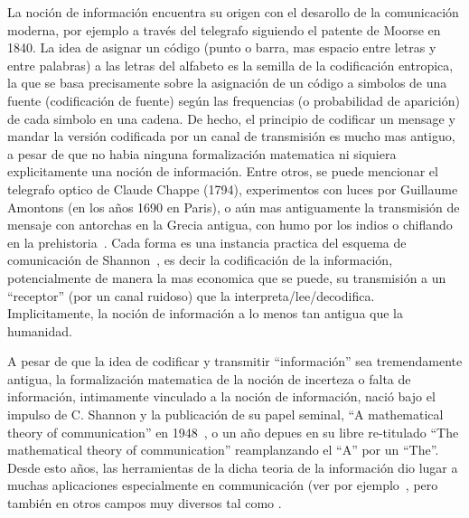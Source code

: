
\label{s:SZ:Introduccion}

La  noci\'on  de  informaci\'on encuentra  su  origen  con  el desarollo  de  la
comunicaci\'on  moderna,  por ejemplo  a  trav\'es  del  telegrafo siguiendo  el
patente de Moorse  en 1840. La idea  de asignar un c\'odigo (punto  o barra, mas
espacio entre letras  y entre palabras) a las letras del  alfabeto es la semilla
de  la  codificaci\'on   entropica,  la  que  se  basa   precisamente  sobre  la
asignaci\'on de un c\'odigo a  simbolos de una fuente (codificaci\'on de fuente)
seg\'un las frequencias  (o probabilidad de aparici\'on) de  cada simbolo en una
cadena.  De  hecho, el principio de  codificar un mensage y  mandar la versi\'on
codificada por un canal de transmisi\'on es mucho mas antiguo, a pesar de que no
habia ninguna formalizaci\'on matematica ni siquiera explicitamente una noci\'on
de informaci\'on.  Entre otros, se puede mencionar el telegrafo optico de Claude
Chappe (1794), experimentos con luces por Guillaume Amontons (en los a\~nos 1690
en Paris), o a\'un mas antiguamente la transmisi\'on de mensaje con antorchas en
la   Grecia   antigua,   con  humo   por   los   indios   o  chiflando   en   la
prehistoria~\cite{Mon08}.  Cada  forma es una instancia practica  del esquema de
comunicaci\'on de Shannon~\cite{Sha48, ShaWea64},  es decir la codificaci\'on de
la informaci\'on,  potencialmente de  manera la mas  economica que se  puede, su
transmisi\'on   a   un   ``receptor''    (por   un   canal   ruidoso)   que   la
interpreta/lee/decodifica.   Implicitamente, la noci\'on  de informaci\'on  a lo
menos tan antigua que la humanidad.

A  pesar  de  que  la  idea  de codificar  y  transmitir  ``informaci\'on''  sea
tremendamente antigua, la formalizaci\'on matematica de la noci\'on de incerteza
o falta de informaci\'on, intimamente  vinculado a la noci\'on de informaci\'on,
naci\'o bajo el  impulso de C.  Shannon y la publicaci\'on  de su papel seminal,
``A  mathematical theory  of communication''  en 1948~\cite{Sha48},  o  un a\~no
depues  en su  libre re-titulado  ``The mathematical  theory  of communication''
reamplanzando el ``A'' por un ``The''. Desde esto a\~nos, las herramientas de la
dicha teoria de  la informaci\'on dio lugar a  muchas aplicaciones especialmente
en communicaci\'on (ver por  ejemplo~\cite[y ref.]{CovTho06, Ver98, Gal01}, pero
tambi\'en en otros campos muy diversos tal como .

